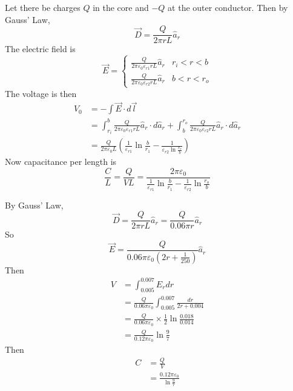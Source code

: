 \documentclass[answers]{exam}
\begin{document}
\begin{questions}

\begin{solution}
	Let there be charges $Q$ in the core and $-Q$ at the outer conductor. Then by Gauss' Law,
	$$\vec{D} = \frac{Q}{2\pi rL}\hat{a}_r$$
	The electric field is
	$$\vec{E} = \begin{cases} \frac{Q}{2\pi\varepsilon_0\varepsilon_{r1}rL}\hat{a}_r & r_i<r<b \\ \frac{Q}{2\pi\varepsilon_0\varepsilon_{r2}rL}\hat{a}_r & b<r<r_o \end{cases}$$
	The voltage is then
	\begin{align*}
		V_0 &= -\int\vec{E} \cdot d\vec{l} \\
		    &= \int_{r_i}^b\frac{Q}{2\pi\varepsilon_0\varepsilon_{r1}rL}\hat{a}_r \cdot d\hat{a}_r + \int_b^{r_o}\frac{Q}{2\pi\varepsilon_0\varepsilon_{r2}rL}\hat{a}_r \cdot d\hat{a}_r \\
		    &= \frac{Q}{2\pi\varepsilon_0L}\left(\frac{1}{\varepsilon_{r1}}\ln\frac{b}{r_1} - \frac{1}{\varepsilon_{r2}\ln\frac{r_o}{b}}\right)
	\end{align*}
	Now capacitance per length is
	$$\frac{C}{L} = \frac{Q}{VL} = \frac{2\pi\varepsilon_0}{\frac{1}{\varepsilon_{r1}}\ln\frac{b}{r_1} - \frac{1}{\varepsilon_{r2}}\ln\frac{r_o}{b}}$$
\end{solution}


\begin{solution}
	By Gauss' Law,
	$$\vec{D} = \frac{Q}{2\pi rL}\hat{a}_r = \frac{Q}{0.06\pi r}\hat{a}_r$$
	So
	$$\vec{E} = \frac{Q}{0.06\pi\varepsilon_0\left(2r+\frac{1}{250}\right)}\hat{a}_r$$
	Then
	\begin{align*}
		V &= \int_{0.005}^{0.007} E_rdr \\
		  &= \frac{Q}{0.06\pi\varepsilon_0} \int_{0.005}^{0.007} \frac{dr}{2r+0.004} \\
		  &= \frac{Q}{0.06\pi\varepsilon_0}\times\frac{1}{2}\ln\frac{0.018}{0.014} \\
		  &= \frac{Q}{0.12\pi\varepsilon_0}\ln\frac{9}{7}
	\end{align*}
	Then
	\begin{align*}
		C &= \frac{Q}{V} \\
		  &= \frac{0.12\pi\varepsilon_0}{\ln\frac{9}{7}}
	\end{align*}
\end{solution}


\end{questions}
\end{document}
